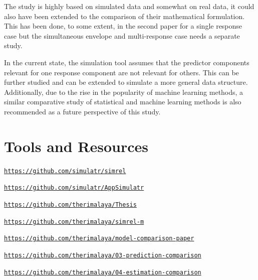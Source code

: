 \documentclass[11pt,twoside,openright,titlepage,
  headinclude,footinclude,BCOR=5mm,
  numbers=noenddot,cleardoublepage=empty,
  tablecaptionabove, dottedtoc,
  bibliography=totoc,paper=a4]{scrreprt}
\providecommand{\tightlist}{%
  \setlength{\itemsep}{0pt}\setlength{\parskip}{0pt}}
\begin{document}
The study is highly based on simulated data and somewhat on real data, it could also have been extended to the comparison of their mathematical formulation. This has been done, to some extent, in the second paper for a single response case but the simultaneous envelope and multi-response case needs a separate study.

In the current state, the simulation tool assumes that the predictor components relevant for one response component are not relevant for others. This can be further studied and can be extended to simulate a more general data structure. Additionally, due to the rise in the popularity of machine learning methods, a similar comparative study of statistical and machine learning methods is also recommended as a future perspective of this study.

\hypertarget{tools-and-resources}{%
\chapter{Tools and Resources}\label{tools-and-resources}}

\begin{description}
\tightlist
\item[R-package:]
\href{https://github.com/simulatr/simrel}{\linebreak \texttt{https://github.com/simulatr/simrel}}
\item[Shiny Application:]
\href{https://github.com/simulatr/AppSimulatr}{\linebreak \texttt{https://github.com/simulatr/AppSimulatr}}
\item[Thesis GitHub Repository:]
\href{https://github.com/therimalaya/Thesis}{\linebreak \texttt{https://github.com/therimalaya/Thesis}}
\item[Paper 1:]
\href{https://github.com/therimalaya/simrel-m}{\linebreak \texttt{https://github.com/therimalaya/simrel-m}}
\item[Paper 2:]
\href{https://github.com/therimalaya/model-comparison-paper}{\linebreak \texttt{https://github.com/therimalaya/model-comparison-paper}}
\item[Paper 3:]
\href{https://github.com/therimalaya/03-prediction-comparison}{\linebreak \texttt{https://github.com/therimalaya/03-prediction-comparison}}
\item[Paper 4:]
\href{https://github.com/therimalaya/04-estimation-comparison}{\linebreak \texttt{https://github.com/therimalaya/04-estimation-comparison}}
\end{description}
\end{document}
